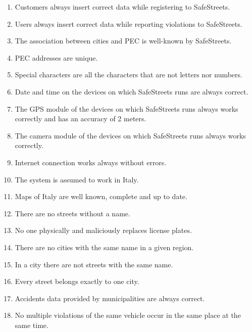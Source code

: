 	\begin{enumerate}[label=\textbf{DA\arabic*}]
		\item \label{dom:correctRegistration} Customers always insert correct data while registering to SafeStreets.
		\item \label{dom:correctViolation} Users always insert correct data while reporting violations to SafeStreets.
		\item \label{dom:pecKnown} The association between cities and PEC is well-known by SafeStreets.
		\item \label{dom:uniquePec} PEC addresses are unique.
		\item \label{dom:specialCharacters} Special characters are all the characters that are not letters nor numbers.
		\item \label{dom:correctDateTime} Date and time on the devices on which SafeStreets runs are always correct.
		\item \label{dom:gpsAccuracy} The GPS module of the devices on which SafeStreets runs always works correctly and has an accuracy of 2 meters.
		\item \label{dom:correctCamera} The camera module of the devices on which SafeStreets runs always works correctly.
		\item \label{dom:correctInternet} Internet connection works always without errors.
		\item \label{dom:italy} The system is assumed to work in Italy.
		\item \label{dom:italyMaps} Maps of Italy are well known, complete and up to date.
		\item \label{dom:nonameStreets} There are no streets without a name.
		\item \label{dom:noMaliciousPlates} No one physically and maliciously replaces license plates.
		\item \label{dom:nosameCities} There are no cities with the same name in a given region.
		\item \label{dom:nosameStreets} In a city there are not streets with the same name.
		\item \label{dom:streetCity} Every street belongs exactly to one city.
		\item \label{dom:correctAccidents} Accidents data provided by municipalities are always correct.
		\item \label{dom:nomultipleViolations} No multiple violations of the same vehicle occur in the same place at the same time.
	\end{enumerate} 
	
